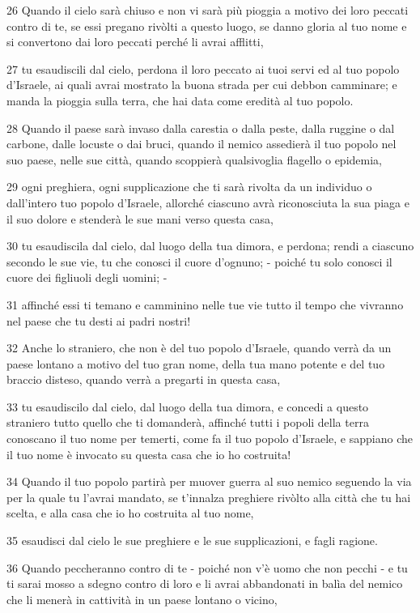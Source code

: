 \par 26 Quando il cielo sarà chiuso e non vi sarà più pioggia a motivo dei loro peccati contro di te, se essi pregano rivòlti a questo luogo, se danno gloria al tuo nome e si convertono dai loro peccati perché li avrai afflitti,
\par 27 tu esaudiscili dal cielo, perdona il loro peccato ai tuoi servi ed al tuo popolo d'Israele, ai quali avrai mostrato la buona strada per cui debbon camminare; e manda la pioggia sulla terra, che hai data come eredità al tuo popolo.
\par 28 Quando il paese sarà invaso dalla carestia o dalla peste, dalla ruggine o dal carbone, dalle locuste o dai bruci, quando il nemico assedierà il tuo popolo nel suo paese, nelle sue città, quando scoppierà qualsivoglia flagello o epidemia,
\par 29 ogni preghiera, ogni supplicazione che ti sarà rivolta da un individuo o dall'intero tuo popolo d'Israele, allorché ciascuno avrà riconosciuta la sua piaga e il suo dolore e stenderà le sue mani verso questa casa,
\par 30 tu esaudiscila dal cielo, dal luogo della tua dimora, e perdona; rendi a ciascuno secondo le sue vie, tu che conosci il cuore d'ognuno; - poiché tu solo conosci il cuore dei figliuoli degli uomini; -
\par 31 affinché essi ti temano e camminino nelle tue vie tutto il tempo che vivranno nel paese che tu desti ai padri nostri!
\par 32 Anche lo straniero, che non è del tuo popolo d'Israele, quando verrà da un paese lontano a motivo del tuo gran nome, della tua mano potente e del tuo braccio disteso, quando verrà a pregarti in questa casa,
\par 33 tu esaudiscilo dal cielo, dal luogo della tua dimora, e concedi a questo straniero tutto quello che ti domanderà, affinché tutti i popoli della terra conoscano il tuo nome per temerti, come fa il tuo popolo d'Israele, e sappiano che il tuo nome è invocato su questa casa che io ho costruita!
\par 34 Quando il tuo popolo partirà per muover guerra al suo nemico seguendo la via per la quale tu l'avrai mandato, se t'innalza preghiere rivòlto alla città che tu hai scelta, e alla casa che io ho costruita al tuo nome,
\par 35 esaudisci dal cielo le sue preghiere e le sue supplicazioni, e fagli ragione.
\par 36 Quando peccheranno contro di te - poiché non v'è uomo che non pecchi - e tu ti sarai mosso a sdegno contro di loro e li avrai abbandonati in balìa del nemico che li menerà in cattività in un paese lontano o vicino,
